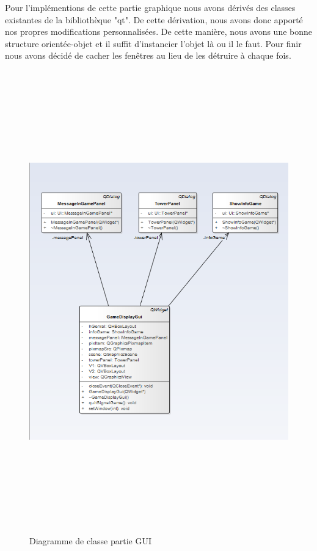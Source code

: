 \documentclass[12pt,a4paper]{article}
\begin{document}
\bigskip
\par
Pour l'implémentions de cette partie graphique nous avons dérivés des classes existantes de la bibliothèque "qt". De cette dérivation, nous avons donc apporté nos propres modifications personnalisées. De cette manière, nous avons une bonne structure orientée-objet et il suffit d'instancier l'objet là ou il le faut. Pour finir nous avons décidé de cacher les fenêtres au lieu de les détruire à chaque fois.

\begin{figure}[H]
  \includegraphics[height=20cm,width=20cm]{guiClass1.png}
  \caption{Diagramme de classe partie GUI}
   \label{fig:picture}
 \end{figure}
\end{document}
